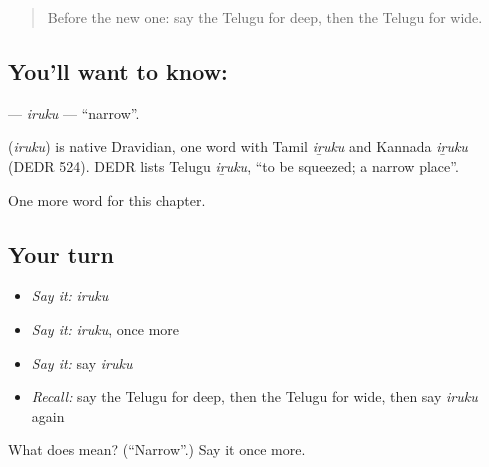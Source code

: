 \label{lesson:TE-C138-iruku}



\begin{quote}
Before the new one: say the Telugu for deep, then the Telugu for wide.
\end{quote}

\subsection*{You'll want to know: }
\textbf{} — \emph{iruku} — \textquotedblleft{}narrow\textquotedblright{}.

\begin{cousinweb}
\textbf{} (\emph{iruku}) is native Dravidian, one word with Tamil \emph{iṟuku} and Kannada \emph{iṟuku} (DEDR 524). DEDR lists Telugu \emph{iṟuku}, \textquotedblleft{}to be squeezed; a narrow place\textquotedblright{}.
\end{cousinweb}

\begin{grammarlens}[title={What you've built}]
One more word for this chapter.
\end{grammarlens}

\subsection*{Your turn}
\begin{itemize}
\raggedright
  \item \emph{Say it:} \emph{iruku}
  \item \emph{Say it:} \emph{iruku}, once more
  \item \emph{Say it:} say \emph{iruku}
  \item \emph{Recall:} say the Telugu for deep, then the Telugu for wide, then say \emph{iruku} again
\end{itemize}

\begin{tcolorbox}[breakable,colback=teal!4,colframe=teal!35!black,title={Before you move on}]
What does  mean? (\textquotedblleft{}Narrow\textquotedblright{}.) Say it once more.
\end{tcolorbox}
